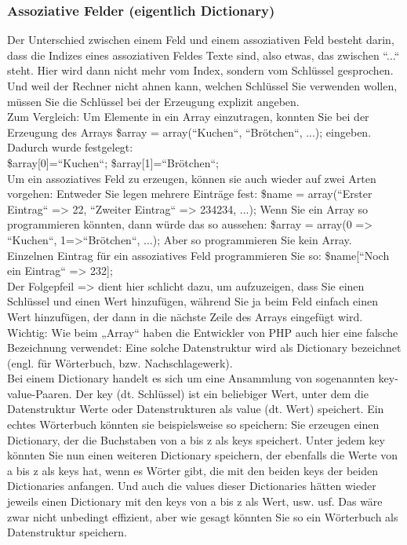 \subsubsection{Assoziative Felder (eigentlich Dictionary)}
Der Unterschied zwischen einem Feld und einem assoziativen Feld besteht darin, dass die Indizes eines assoziativen Feldes Texte sind, also etwas, das zwischen ``...`` steht. Hier wird dann nicht mehr vom Index, sondern vom Schlüssel gesprochen. Und weil der Rechner nicht ahnen kann, welchen Schlüssel Sie verwenden wollen, müssen Sie die Schlüssel bei der Erzeugung explizit angeben.\\

Zum Vergleich: Um Elemente in ein Array einzutragen, konnten Sie bei der Erzeugung des Arrays \$array = array(``Kuchen``, ``Brötchen``, ...); eingeben. Dadurch wurde festgelegt: \\

\$array[0]=``Kuchen``; \$array[1]=``Brötchen``;\\

Um ein assoziatives Feld zu erzeugen, können sie auch wieder auf zwei Arten vorgehen: Entweder Sie legen mehrere Einträge fest: \$name = array(``Erster Eintrag`` => 22, ``Zweiter Eintrag`` => 234234, ...); Wenn Sie ein Array so programmieren könnten, dann würde das so aussehen: \$array = array(0 => ``Kuchen``, 1=>``Brötchen``, ...); Aber so programmieren Sie kein Array.\\

Einzelnen Eintrag für ein assoziatives Feld programmieren Sie so: \$name[``Noch ein Eintrag`` => 232];\\

Der Folgepfeil => dient hier schlicht dazu, um aufzuzeigen, dass Sie einen Schlüssel und einen Wert hinzufügen, während Sie ja beim Feld einfach einen Wert hinzufügen, der dann in die nächste Zeile des Arrays eingefügt wird.\\

Wichtig: Wie beim „Array“ haben die Entwickler von PHP auch hier eine falsche Bezeichnung verwendet: Eine solche Datenstruktur wird als Dictionary bezeichnet (engl. für Wörterbuch, bzw. Nachschlagewerk). \\

Bei einem Dictionary handelt es sich um eine Ansammlung von sogenannten key-value-Paaren. Der key (dt. Schlüssel) ist ein beliebiger Wert, unter dem die Datenstruktur Werte oder Datenstrukturen als value (dt. Wert) speichert. Ein echtes Wörterbuch könnten sie beispielsweise so speichern: Sie erzeugen einen Dictionary, der die Buchstaben von a bis z als keys speichert. Unter jedem key könnten Sie nun einen weiteren Dictionary speichern, der ebenfalls die Werte von a bis z als keys hat, wenn es Wörter gibt, die mit den beiden keys der beiden Dictionaries anfangen. Und auch die values dieser Dictionaries hätten wieder jeweils einen Dictionary mit den keys von a bis z als Wert, usw. usf. Das wäre zwar nicht unbedingt effizient, aber wie gesagt könnten Sie so ein Wörterbuch als Datenstruktur speichern.\\

